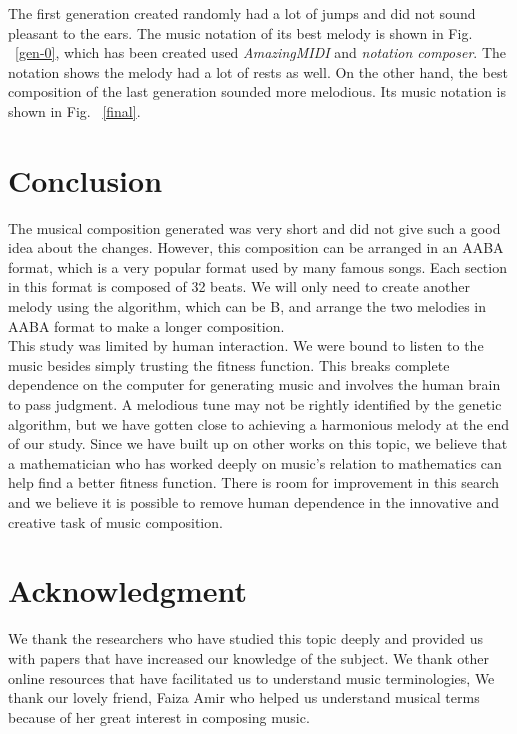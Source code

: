 \documentclass[conference]{IEEEtran}
\begin{document}
The first generation created randomly had a lot of jumps and did not sound pleasant to the ears. The music notation of its best melody is shown in Fig. ~\ref{gen-0}, which has been created used \textit{AmazingMIDI} and \textit{notation composer}. The notation shows the melody had a lot of rests as well. On the other hand, the best composition of the last generation sounded more melodious. Its music notation is shown in Fig. ~\ref{final}.


\section{Conclusion}
The musical composition generated was very short and did not give such a good idea about the changes. However, this composition can be arranged in an AABA format, which is a very popular format used by many famous songs. Each section in this format is composed of 32 beats. We will only need to create another melody using the algorithm, which can be B, and arrange the two melodies in AABA format to make a longer composition.\\

This study was limited by human interaction. We were bound to listen to the music besides simply trusting the fitness function. This breaks complete dependence on the computer for generating music and involves the human brain to pass judgment. A melodious tune may not be rightly identified by the genetic algorithm, but we have gotten close to achieving a harmonious melody at the end of our study. Since we have built up on other works on this topic, we believe that a mathematician who has worked deeply on music's relation to mathematics can help find a better fitness function. There is room for improvement in this search and we believe it is possible to remove human dependence in the innovative and creative task of music composition.

\section*{Acknowledgment}
 We thank the researchers who have studied this topic deeply and provided us with papers that have increased our knowledge of the subject. We thank other online resources that have facilitated us to understand music terminologies, We thank our lovely friend, Faiza Amir who helped us understand musical terms because of her great interest in composing music.
\end{document}
